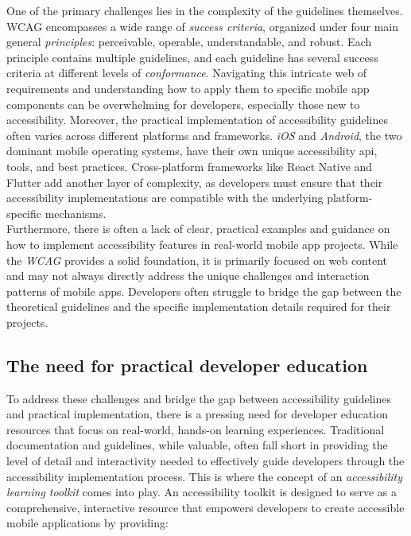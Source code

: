 One of the primary challenges lies in the complexity of the guidelines themselves. WCAG encompasses a wide range of \textit{success criteria}, organized under four main general \textit{principles}: perceivable, operable, understandable, and robust. Each principle contains multiple guidelines, and each guideline has several success criteria at different levels of \textit{conformance}. Navigating this intricate web of requirements and understanding how to apply them to specific mobile app components can be overwhelming for developers, especially those new to accessibility. 
Moreover, the practical implementation of accessibility guidelines often varies across different platforms and frameworks. \textit{iOS} and \textit{Android}, the two dominant mobile operating systems, have their own unique accessibility \acrshort{api}, tools, and best practices. Cross-platform frameworks like React Native and Flutter add another layer of complexity, as developers must ensure that their accessibility implementations are compatible with the underlying platform-specific mechanisms. \\ 

Furthermore, there is often a lack of clear, practical examples and guidance on how to implement accessibility features in real-world mobile app projects. While the \textit{WCAG} provides a solid foundation, it is primarily focused on web content and may not always directly address the unique challenges and interaction patterns of mobile apps. Developers often struggle to bridge the gap between the theoretical guidelines and the specific implementation details required for their projects.

\subsection{The need for practical developer education}

To address these challenges and bridge the gap between accessibility guidelines and practical implementation, there is a pressing need for developer education resources that focus on real-world, hands-on learning experiences. Traditional documentation and guidelines, while valuable, often fall short in providing the level of detail and interactivity needed to effectively guide developers through the accessibility implementation process.
This is where the concept of an \textit{accessibility learning toolkit} comes into play. An accessibility toolkit is designed to serve as a comprehensive, interactive resource that empowers developers to create accessible mobile applications by providing:

